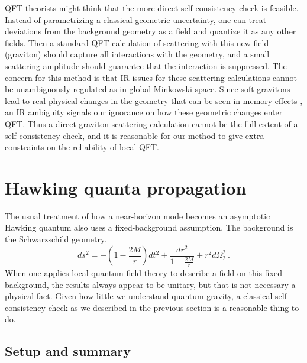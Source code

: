 \documentclass[aps,showpacs,onecolumn,floats,prd,superscriptaddress,nofootinbib]{revtex4-1}
\begin{document}
QFT theorists might think that the more direct self-consistency check is feasible.
Instead of parametrizing a classical geometric uncertainty, one can treat deviations from the background geometry as a field and quantize it as any other fields.
Then a standard QFT calculation of scattering with this new field (graviton) should capture all interactions with the geometry, and a small scattering amplitude should guarantee that the interaction is suppressed. 
The concern for this method is that IR issues for these scattering calculations cannot be unambiguously regulated as in global Minkowski space.
Since soft gravitons lead to real physical changes in the geometry that can be seen in memory effects \cite{Wei65,HeLys14}, an IR ambiguity signals our ignorance on how these geometric changes enter QFT.
Thus a direct graviton scattering calculation cannot be the full extent of a self-consistency check, and it is reasonable for our method to give extra constraints on the reliability of local QFT.

\section{Hawking quanta propagation}
\label{sec-BlackHole}

The usual treatment of how a near-horizon mode becomes an asymptotic Hawking quantum also uses a fixed-background assumption.
The background is the Schwarzschild geometry.
\begin{equation}
ds^2 = -\left(1-\frac{2M}{r}\right)dt^2 + \frac{dr^2}{1-\frac{2M}{r}} + r^2d\Omega_2^2~.
\label{eq-metric}
\end{equation}
When one applies local quantum field theory to describe a field on this fixed background, the results always appear to be unitary, but that is not necessary a physical fact. 
Given how little we understand quantum gravity, a classical self-consistency check as we described in the previous section is a reasonable thing to do.

\subsection{Setup and summary}
\end{document}
